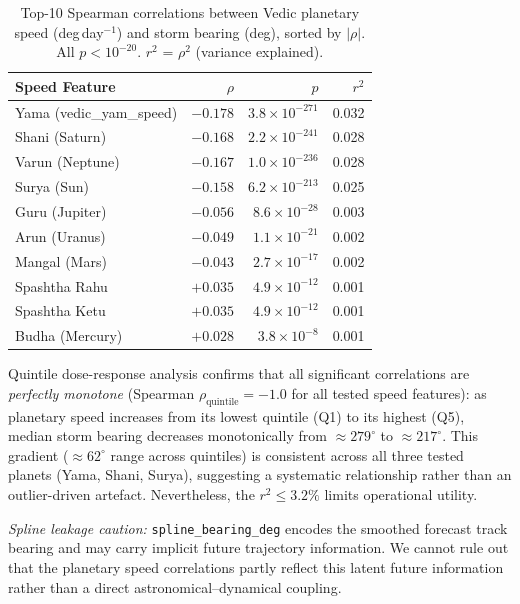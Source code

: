 \documentclass[12pt,a4paper]{article}
\newcommand{\caution}[1]{\textcolor{notecolor}{\textit{#1}}}
\begin{document}
\begin{table}[H]
  \centering
  \caption{Top-10 Spearman correlations between Vedic planetary speed
           (deg\,day$^{-1}$) and storm bearing (deg), sorted by $|\rho|$.
           All $p < 10^{-20}$. $r^2$ = $\rho^2$ (variance explained).}
  \label{tab:h3_spearman}
  \begin{tabular}{lrrr}
    \toprule
    \textbf{Speed Feature} & \boldmath$\rho$ & \boldmath$p$ & \boldmath$r^2$ \\
    \midrule
    Yama (vedic\_yam\_speed)    & $-0.178$ & $3.8\times10^{-271}$ & 0.032 \\
    Shani (Saturn)              & $-0.168$ & $2.2\times10^{-241}$ & 0.028 \\
    Varun (Neptune)             & $-0.167$ & $1.0\times10^{-236}$ & 0.028 \\
    Surya (Sun)                 & $-0.158$ & $6.2\times10^{-213}$ & 0.025 \\
    Guru (Jupiter)              & $-0.056$ & $8.6\times10^{-28}$  & 0.003 \\
    Arun (Uranus)               & $-0.049$ & $1.1\times10^{-21}$  & 0.002 \\
    Mangal (Mars)               & $-0.043$ & $2.7\times10^{-17}$  & 0.002 \\
    Spashtha Rahu               & $+0.035$ & $4.9\times10^{-12}$  & 0.001 \\
    Spashtha Ketu               & $+0.035$ & $4.9\times10^{-12}$  & 0.001 \\
    Budha (Mercury)             & $+0.028$ & $3.8\times10^{-8}$   & 0.001 \\
    \bottomrule
  \end{tabular}
\end{table}

Quintile dose-response analysis confirms that all significant correlations are
\emph{perfectly monotone} (Spearman $\rho_\text{quintile} = -1.0$ for all
tested speed features): as planetary speed increases from its lowest quintile
(Q1) to its highest (Q5), median storm bearing decreases monotonically from
$\approx 279^\circ$ to $\approx 217^\circ$.
This gradient ($\approx 62^\circ$ range across quintiles) is consistent across all
three tested planets (Yama, Shani, Surya), suggesting a systematic relationship
rather than an outlier-driven artefact.
Nevertheless, the $r^2 \leq 3.2\%$ limits operational utility.

\caution{Spline leakage caution:} \texttt{spline\_bearing\_deg} encodes the
smoothed forecast track bearing and may carry implicit future trajectory
information.
We cannot rule out that the planetary speed correlations partly reflect this
latent future information rather than a direct astronomical--dynamical coupling.
\end{document}
